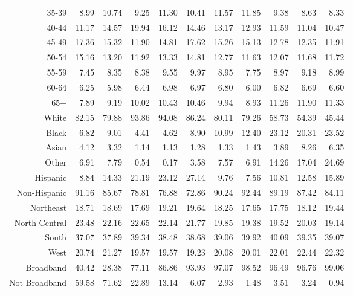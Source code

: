 \begin{table}[!htb]
\begin{tabular}{rrrrrrrrrrr}
  35-39 & 8.99 & 10.74 & 9.25 & 11.30 & 10.41 & 11.57 & 11.85 & 9.38 & 8.63 & 8.33 \\ 
  40-44 & 11.17 & 14.57 & 19.94 & 16.12 & 14.46 & 13.17 & 12.93 & 11.59 & 11.04 & 10.47 \\ 
  45-49 & 17.36 & 15.32 & 11.90 & 14.81 & 17.62 & 15.26 & 15.13 & 12.78 & 12.35 & 11.91 \\ 
  50-54 & 15.16 & 13.20 & 11.92 & 13.33 & 14.81 & 12.77 & 11.63 & 12.07 & 11.68 & 11.72 \\ 
  55-59 & 7.45 & 8.35 & 8.38 & 9.55 & 9.97 & 8.95 & 7.75 & 8.97 & 9.18 & 8.99 \\ 
  60-64 & 6.25 & 5.98 & 6.44 & 6.98 & 6.97 & 6.80 & 6.00 & 6.82 & 6.69 & 6.60 \\ 
  65+ & 7.89 & 9.19 & 10.02 & 10.43 & 10.46 & 9.94 & 8.93 & 11.26 & 11.90 & 11.33 \\ 
  White & 82.15 & 79.88 & 93.86 & 94.08 & 86.24 & 80.11 & 79.26 & 58.73 & 54.39 & 45.44 \\ 
  Black & 6.82 & 9.01 & 4.41 & 4.62 & 8.90 & 10.99 & 12.40 & 23.12 & 20.31 & 23.52 \\ 
  Asian & 4.12 & 3.32 & 1.14 & 1.13 & 1.28 & 1.33 & 1.43 & 3.89 & 8.26 & 6.35 \\ 
  Other & 6.91 & 7.79 & 0.54 & 0.17 & 3.58 & 7.57 & 6.91 & 14.26 & 17.04 & 24.69 \\ 
  Hispanic & 8.84 & 14.33 & 21.19 & 23.12 & 27.14 & 9.76 & 7.56 & 10.81 & 12.58 & 15.89 \\ 
  Non-Hispanic & 91.16 & 85.67 & 78.81 & 76.88 & 72.86 & 90.24 & 92.44 & 89.19 & 87.42 & 84.11 \\ 
  Northeast & 18.71 & 18.69 & 17.69 & 19.21 & 19.64 & 18.25 & 17.65 & 17.75 & 18.12 & 19.44 \\ 
  North Central & 23.48 & 22.16 & 22.65 & 22.14 & 21.77 & 19.85 & 19.38 & 19.52 & 20.03 & 19.14 \\ 
  South & 37.07 & 37.89 & 39.34 & 38.48 & 38.68 & 39.06 & 39.92 & 40.09 & 39.35 & 39.07 \\ 
  West & 20.74 & 21.27 & 19.57 & 19.57 & 19.23 & 20.08 & 20.01 & 22.01 & 22.44 & 22.32 \\ 
  Broadband & 40.42 & 28.38 & 77.11 & 86.86 & 93.93 & 97.07 & 98.52 & 96.49 & 96.76 & 99.06 \\ 
  Not Broadband & 59.58 & 71.62 & 22.89 & 13.14 & 6.07 & 2.93 & 1.48 & 3.51 & 3.24 & 0.94 \\ 
   \hline
\end{tabular}
\endgroup
\end{table}
